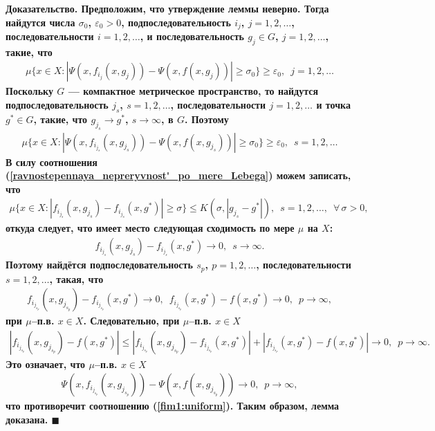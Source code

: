 \documentclass{report}
\newenvironment{Proof}{\par\noindent\bf Доказательство.\rm}{ $\blacksquare$\par}
\begin{document}
\begin{Proof}
Предположим, что утверждение леммы неверно. Тогда найдутся числа $\sigma_0$, $\varepsilon_0>0$, подпоследовательность $i_j$, $j=1,2,\dots$, последовательности $i=1,2,\dots$, и
последовательность $g_j\in G$, $j=1,2,\dots$, такие, что
\begin{gather*}
\mu\{x\in X:|\Psi(x,f_{i_j}(x,g_j))-\Psi(x,f(x,g_j))|\geqslant\sigma_0\}\geqslant\varepsilon_0,\,\,\,j=1,2,\dots
\end{gather*}
Поскольку  $G$ --- компактное метрическое пространство, то найдутся подпоследовательность $j_s$, $s=1,2,\dots$, последовательности $j=1,2,\dots$ и точка $g^*\in G$, такие, что
$g_{j_s}\to g^*$, $s\to\infty$, в $G$. Поэтому
\begin{gather}\label{fim1:uniform}
\mu\{x\in X:|\Psi(x,f_{i_{j_s}}(x,g_{j_s}))-\Psi(x,f(x,g_{j_s}))|\geqslant\sigma_0\}\geqslant\varepsilon_0,\,\,\,s=1,2,\dots
\end{gather}
В силу соотношения (\ref{ravnostepennaya_nepreryvnost'_po_mere_Lebega}) можем записать, что
\begin{gather*}
\mu\{x\in X:|f_{i_{j_s}}(x,g_{j_s})-f_{i_{j_s}}(x,g^*)|\geqslant\sigma\}\leqslant K(\sigma,|g_{j_s}-g^*|),\,\,\,s=1,2,\dots,\,\,\,
\forall\,\sigma>0,
\end{gather*}
откуда следует, что имеет место следующая сходимость по мере $\mu$ на $X$:
\begin{gather*}
f_{i_{j_s}}(x,g_{j_s})-f_{i_{j_s}}(x,g^*)\to0,\,\,\,s\to\infty.
\end{gather*}
Поэтому найдётся подпоследовательность $s_p$, $p=1,2,\dots$, последовательности $s=1,2,\dots$, такая, что
\begin{gather*}
f_{i_{j_{s_p}}}(x,g_{j_{s_p}})-f_{i_{j_{s_p}}}(x,g^*)\to0,\,\,\, f_{i_{j_{s_p}}}(x,g^*)-f(x,g^*)\to0,\,\,\,p\to\infty,
\end{gather*}
при $\mu$--п.в. $x\in X$. Следовательно, при $\mu$--п.в. $x\in X$
\begin{gather*}
|f_{i_{j_{s_p}}}(x,g_{j_{s_p}})-f(x,g^*)|\leqslant|f_{i_{j_{s_p}}}(x,g_{j_{s_p}})-f_{i_{j_{s_p}}}(x,g^*)|+|f_{i_{j_{s_p}}}(x,g^*)-f(x,g^*)|\to0,\,\,\,p\to\infty.
\end{gather*}
Это означает, что $\mu$--п.в. $x\in X$
\begin{gather*}
\Psi(x,f_{i_{j_{s_p}}}(x,g_{j_{s_p}}))-\Psi(x,f(x,g_{j_{s_p}}))\to0,\,\,\,p\to\infty,
\end{gather*}
что противоречит соотношению (\ref{fim1:uniform}). Таким образом, лемма доказана.
\end{Proof}
\end{document}
